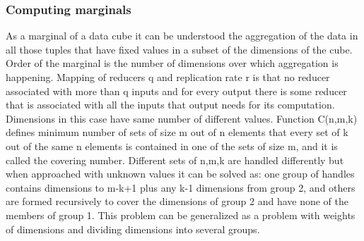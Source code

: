 \subsubsection{Computing marginals} \label{marginals}
As a marginal of a data cube it can be understood the aggregation of the data in all those tuples that have fixed values in a subset of the dimensions of the cube. Order of the marginal is the number of dimensions over which aggregation is happening. Mapping of reducers q and replication rate r is that no reducer associated with more than q inputs and for every output there is some reducer that is associated with all the inputs that output needs for its computation. Dimensions in this case have same number of different values.
Function C(n,m,k) defines minimum number of sets of size m out of n elements that every set of k out of the same n elements is contained in one of the sets of size m, and it is called the covering number.
Different sets of n,m,k are handled differently but when approached with unknown values it can be solved as: one group of handles contains dimensions to m-k+1 plus any k-1 dimensions from group 2, and others are formed recursively to cover the dimensions of group 2 and have none of the members of group 1.
This problem can be generalized as a problem with weights of dimensions and dividing dimensions into several groups. \cite{marginals}


